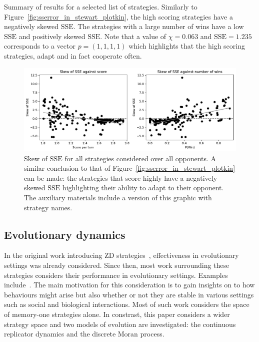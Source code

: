 \documentclass[a4paper]{article}
\newcommand{\SSe}{\text{SSE}}
\begin{document}
\begin{table}[!hbtp]
    \begin{center}
    \small
    
    \end{center}
    \caption{Summary of results for a selected list of strategies. Similarly to
        Figure~\ref{fig:sserror_in_stewart_plotkin}, the high scoring strategies
        have a negatively skewed \(\SSe\). The strategies with a
        large number of wins have a low \(\SSe\) and positively skewed
        \(\SSe\). Note that a value of \(\chi=0.063\) and \(\SSe=1.235\)
        corresponds to a vector \(p=(1,1,1,1)\) which highlights that the high
        scoring strategies, adapt and in fact cooperate often.}
    \label{tbl:overall_summary_results}
\end{table}

\begin{figure}[!htbp]
    \centering
    \includegraphics[width=\textwidth]{./assets/img/sserror_in_std/main.pdf}
    \caption{Skew of \(\SSe\) for all strategies considered over all opponents.
        A similar conclusion to that of
        Figure~\ref{fig:sserror_in_stewart_plotkin} can be made: the strategies
        that score highly have a negatively skewed \(\SSe\) highlighting their
        ability to adapt to their opponent. The auxiliary materials include a
        version of this graphic with strategy names.}
        \label{fig:sserror_in_std}
\end{figure}

\subsection{Evolutionary dynamics}\label{sec:evolutionary-dynamics}

In the original work introducing ZD strategies~\cite{Press2012}, effectiveness
in evolutionary settings was already considered. Since then, most work
surrounding these strategies considers their performance in evolutionary
settings. Examples include~\cite{adami2013evolutionary, hilbe2018partners,
Hilbe2013, hilbe2013adaptive, hilbe2015partners, ichinose2018zero, Moran1707}.
The main motivation for this consideration is to gain insights on to how
behaviours might arise but also whether or not they are stable in various
settings such as social and biological interactions. Most of such work
considers the space of memory-one strategies alone. In constrast, this paper considers a wider
strategy space and two models of evolution are investigated: the
continuous replicator dynamics and the discrete Moran process.
\end{document}
